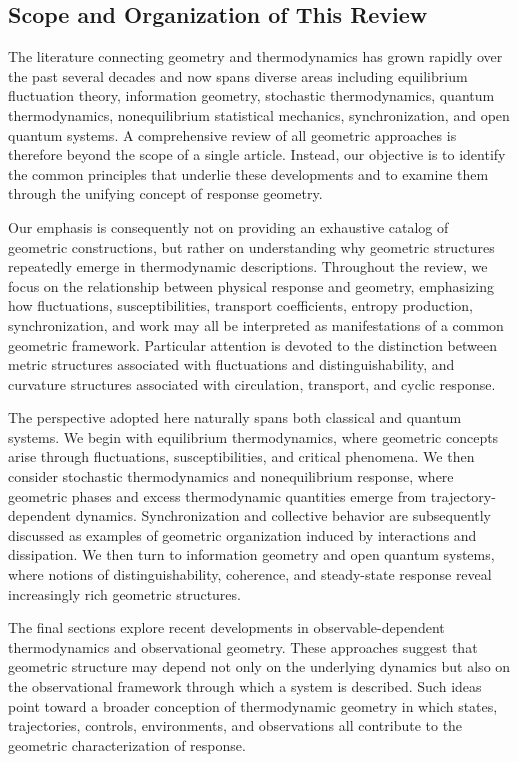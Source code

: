 \subsection{Scope and Organization of This Review}

The literature connecting geometry and thermodynamics has grown rapidly over the past several decades and now spans diverse areas including equilibrium fluctuation theory, information geometry, stochastic thermodynamics, quantum thermodynamics, nonequilibrium statistical mechanics, synchronization, and open quantum systems. A comprehensive review of all geometric approaches is therefore beyond the scope of a single article. Instead, our objective is to identify the common principles that underlie these developments and to examine them through the unifying concept of response geometry.

Our emphasis is consequently not on providing an exhaustive catalog of geometric constructions, but rather on understanding why geometric structures repeatedly emerge in thermodynamic descriptions. Throughout the review, we focus on the relationship between physical response and geometry, emphasizing how fluctuations, susceptibilities, transport coefficients, entropy production, synchronization, and work may all be interpreted as manifestations of a common geometric framework. Particular attention is devoted to the distinction between metric structures associated with fluctuations and distinguishability, and curvature structures associated with circulation, transport, and cyclic response.

The perspective adopted here naturally spans both classical and quantum systems. We begin with equilibrium thermodynamics, where geometric concepts arise through fluctuations, susceptibilities, and critical phenomena. We then consider stochastic thermodynamics and nonequilibrium response, where geometric phases and excess thermodynamic quantities emerge from trajectory-dependent dynamics. Synchronization and collective behavior are subsequently discussed as examples of geometric organization induced by interactions and dissipation. We then turn to information geometry and open quantum systems, where notions of distinguishability, coherence, and steady-state response reveal increasingly rich geometric structures.

The final sections explore recent developments in observable-dependent thermodynamics and observational geometry. These approaches suggest that geometric structure may depend not only on the underlying dynamics but also on the observational framework through which a system is described. Such ideas point toward a broader conception of thermodynamic geometry in which states, trajectories, controls, environments, and observations all contribute to the geometric characterization of response.

